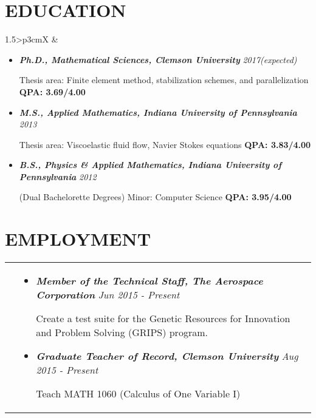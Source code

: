 \documentclass[10pt]{article}
\begin{document}
\section{\textbf{EDUCATION}}
\vspace*{-\baselineskip}
\hskip-1.7in
\begin{tabularx}{1.5\linewidth}{>{\raggedleft\scshape}p{3cm}X}
  &\begin{itemize}
    \setlength\itemsep{.005em}
  \item \textbf{\textit{Ph.D., Mathematical Sciences, Clemson University}}  \hspace{44 mm} \textit{2017(expected)}
  
             Thesis area: Finite element method, stabilization schemes, and parallelization \textbf{QPA: 3.69/4.00}
             
\item \textbf{\textit{M.S., Applied Mathematics, Indiana University of Pennsylvania}} \hspace{20.5 mm} \textit{2013}
  
             Thesis area: Viscoelastic fluid flow, Navier Stokes equations \textbf{QPA: 3.83/4.00}
             
\item \textbf{\textit{B.S., Physics \& Applied Mathematics, Indiana University of Pennsylvania}} \hspace{3 mm}\textit{2012}
  
             (Dual Bachelorette Degrees) Minor: Computer Science \textbf{QPA: 3.95/4.00}
             
  \end{itemize} 

\end{tabularx}

\section{\textbf{EMPLOYMENT}}
\vspace*{-\baselineskip}
\hskip-1.7in
\begin{tabularx}{1.5\linewidth}{>{\raggedleft\scshape}p{3cm}X}

  &\begin{itemize}
    \setlength\itemsep{.005em}
  \item \textbf{\textit{Member of the Technical Staff, The Aerospace Corporation}}    \hspace{17 mm}\textit{Jun 2015 - Present}
  
Create a test suite for the Genetic Resources for Innovation and Problem Solving (GRIPS) program. 
               
                   \setlength\itemsep{.005em}
  \item \textbf{\textit{Graduate Teacher of Record, 
  Clemson University}}    \hspace{34 mm}\textit{Aug 2015 - Present}
  
Teach MATH 1060 (Calculus of One Variable I)
  \end{itemize} 

\end{tabularx}
\end{document}
